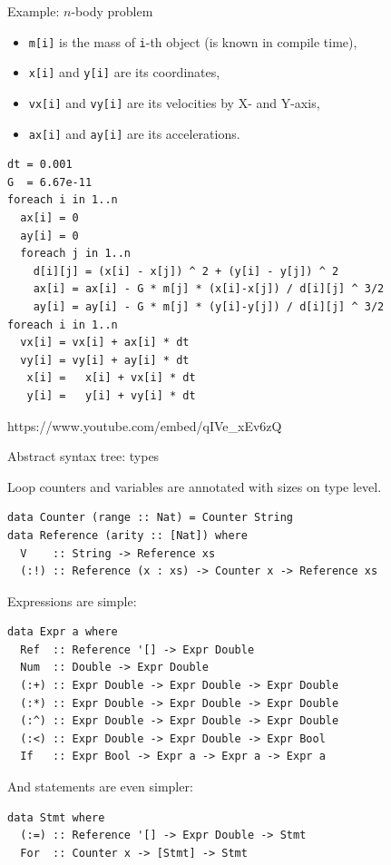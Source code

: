 \documentclass[handout]{beamer}
\begin{document}
\begin{frame}[fragile]{Example: $n$-body problem}

\begin{itemize}
\item {\tt m[i]} is the mass of {\tt i}-th object (is known in compile time),
\item {\tt x[i]} and {\tt y[i]} are its coordinates,
\item {\tt vx[i]} and {\tt vy[i]} are its velocities by X- and Y-axis,
\item {\tt ax[i]} and {\tt ay[i]} are its accelerations.
\end{itemize}

\begin{lstlisting}
dt = 0.001
G  = 6.67e-11
foreach i in 1..n
  ax[i] = 0
  ay[i] = 0
  foreach j in 1..n
    d[i][j] = (x[i] - x[j]) ^ 2 + (y[i] - y[j]) ^ 2
    ax[i] = ax[i] - G * m[j] * (x[i]-x[j]) / d[i][j] ^ 3/2
    ay[i] = ay[i] - G * m[j] * (y[i]-y[j]) / d[i][j] ^ 3/2
foreach i in 1..n
  vx[i] = vx[i] + ax[i] * dt
  vy[i] = vy[i] + ay[i] * dt
   x[i] =   x[i] + vx[i] * dt
   y[i] =   y[i] + vy[i] * dt
\end{lstlisting}

\centerline{https://www.youtube.com/embed/qIVe\_xEv6zQ}

\end{frame}

\begin{frame}[fragile]{Abstract syntax tree: types}

Loop counters and variables are annotated with sizes on type level.

\begin{lstlisting}
data Counter (range :: Nat) = Counter String
data Reference (arity :: [Nat]) where
  V    :: String -> Reference xs
  (:!) :: Reference (x : xs) -> Counter x -> Reference xs
\end{lstlisting}

Expressions are simple:

\begin{lstlisting}
data Expr a where
  Ref  :: Reference '[] -> Expr Double
  Num  :: Double -> Expr Double
  (:+) :: Expr Double -> Expr Double -> Expr Double
  (:*) :: Expr Double -> Expr Double -> Expr Double
  (:^) :: Expr Double -> Expr Double -> Expr Double
  (:<) :: Expr Double -> Expr Double -> Expr Bool
  If   :: Expr Bool -> Expr a -> Expr a -> Expr a
\end{lstlisting}

And statements are even simpler:

\begin{lstlisting}
data Stmt where
  (:=) :: Reference '[] -> Expr Double -> Stmt
  For  :: Counter x -> [Stmt] -> Stmt
\end{lstlisting}

\end{frame}
\end{document}
